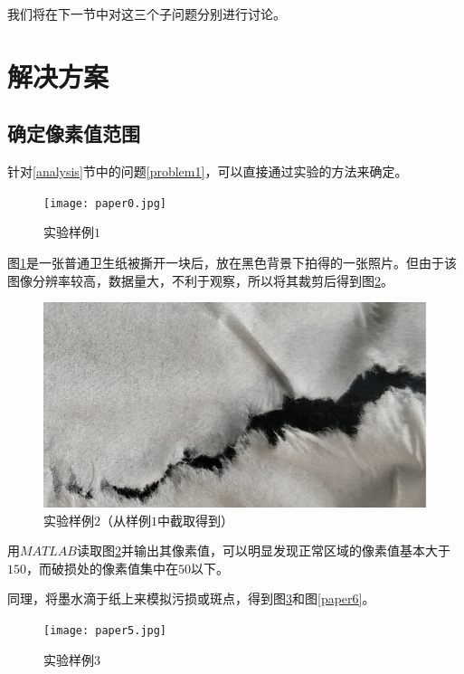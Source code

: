 \documentclass[UTF8]{ctexart}
\begin{document}
	\indent 我们将在下一节中对这三个子问题分别进行讨论。
	
	

	
	\section{解决方案}
		\subsection{确定像素值范围}
		
			\indent 针对\ref{analysis}节中的问题\ref{problem1}，可以直接通过实验的方法来确定。
			
			\begin{figure}[H]
				\centering 
				\texttt{[image: paper0.jpg]} 
				\caption{实验样例$1$} 
				\label{paper0}
			\end{figure}
			
			\indent 图\ref{paper0}是一张普通卫生纸被撕开一块后，放在黑色背景下拍得的一张照片。但由于该图像分辨率较高，数据量大，不利于观察，所以将其裁剪后得到图\ref{paper3}。
		
			\begin{figure}[H]
				\centering 
				\includegraphics[scale=0.3]{paper3.jpg} 
				\caption{实验样例$2$（从样例$1$中截取得到）} 
				\label{paper3}
			\end{figure}
			
			\indent 用$MATLAB$读取图\ref{paper3}并输出其像素值，可以明显发现正常区域的像素值基本大于$150$，而破损处的像素值集中在$50$以下。
			
			\indent 同理，将墨水滴于纸上来模拟污损或斑点，得到图\ref{paper5}和图\ref{paper6}。
			
			\begin{figure}[H]
				\centering 
				\texttt{[image: paper5.jpg]} 
				\caption{实验样例$3$} 
				\label{paper5}
			\end{figure}
		
\end{document}
